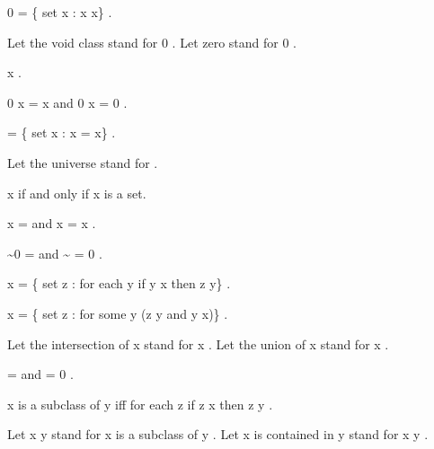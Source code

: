 \documentclass[a4paper,draft]{amsproc}
\begin{document}
\begin{forthel}
\begin{definition}  0 = \{ set  x : x \neq x\} .\end{definition}
Let the void class stand for  0 .
Let zero stand for  0 .

\begin{theorem}
 x  .
\end{theorem}

\begin{theorem}
 0 \cup x = x  and  0 \cap x = 0 .
\end{theorem}

\begin{definition}
	  = \{ set  x : x = x\} .
\end{definition}
Let the universe stand for   .

\begin{theorem}
 x \in {}  if and only if  x  is a set.
\end{theorem}

\begin{theorem}
 x \cup {} =   and  x \cap {} = x .
\end{theorem}

\begin{theorem}
 \sim 0 =   and  \sim {} = 0 .
\end{theorem}

\begin{definition}  \bigcap x = 
\{ set  z :  for each  y  if  y \in x  then  z \in y\} .\end{definition}

\begin{definition}  \bigcup x = 
\{ set  z :  for some  y   (z \in y  and  y \in x)\} .\end{definition}

Let the intersection of  x  stand for  \bigcap x .
Let the union of  x  stand for  \bigcup x .

\begin{theorem}
  =   and   = 0 .
\end{theorem}

\begin{definition}  x  is a subclass of  y  iff 
for each  z  if  z \in x  then  z \in y .
\end{definition}

Let  x \subset y  stand for  x  is a subclass of  y .
Let  x  is contained in  y  stand for  x \subset y .


\end{forthel}
\end{document}
